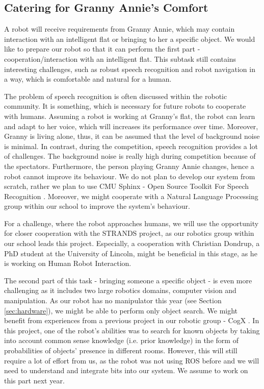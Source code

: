\documentclass[conference]{IEEEtran}
\begin{document}
\subsection{Catering for Granny Annie’s Comfort}

A robot will receive requirements from Granny Annie, which may contain interaction with an intelligent flat or bringing to her a specific object. We would like to prepare our robot so that it can perform the first part - cooperation/interaction with an intelligent flat. This subtask still contains interesting challenges, such as robust speech recognition and robot navigation in a way, which is comfortable and natural for a human.  

The problem of speech recognition is often discussed within the robotic community. It is something, which is necessary for future robots to cooperate with humans. Assuming a robot is working at Granny's flat, the robot can learn and adapt to her voice, which will increases its performance over time. Moreover, Granny is living alone, thus, it can be assumed that the level of background noise is minimal. In contrast, during the competition, speech recognition provides a lot of challenges. The background noise is really high during competition because of the spectators. Furthermore, the person playing Granny Annie changes, hence a robot cannot improve its behaviour. We do not plan to develop our system from scratch, rather we plan to use CMU Sphinx - Open Source Toolkit For Speech Recognition \cite{cmu}. 
Moreover, we might cooperate with a Natural Language Processing group within our school to improve the system's behaviour.

For a challenge, where the robot approaches humans, we will use the opportunity for closer cooperation with the STRANDS \cite{strands} project, as our robotics group within our school leads this project. Especially, a cooperation with Christian Dondrup, a PhD student at the University of Lincoln, might be beneficial in this stage, as he is working on Human Robot Interaction.

The second part of this task - bringing someone a specific object - is even more challenging as it includes two large robotics domains, computer vision and manipulation. As our robot has no manipulator this year (see Section \ref{sec:hardware}), we might be able to perform only object search. We might benefit from experiences from a previous project in our robotic group - CogX \cite{cogx}. In this project, one of the robot's abilities was to search for known objects by taking into account common sense knowledge (i.e. prior knowledge) in the form of probabilities of objects' presence in different rooms. However, this will still require a lot of effort from us, as the robot was not using ROS before and we will need to understand and integrate bits into our system. We assume to work on this part next year.
\end{document}
